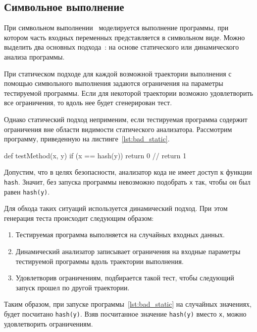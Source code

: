 \subsection{Символьное выполнение}
При символьном выполнении~\cite{symbolic_sbst} моделируется выполнение программы, при котором часть входных переменных представляется в символьном виде. Можно 
выделить два основных подхода~\cite{symbolic_execution}: на основе статического или динамического анализа программы.

При статическом подходе для каждой возможной траектории выполнения с помощью символьного выполнения задаются ограничения на параметры тестируемой программы. 
Если для некоторой траектории возможно удовлетворить все ограничения, то вдоль нее будет сгенерирован тест.

Однако статический подход неприменим, если тестируемая программа содержит ограничения вне области видимости статического анализатора. Рассмотрим программу, 
приведенную на листинге~\ref{lst:bad_static}.

\begin{snippet}[caption={Пример, на котором не применим статический подход}, label={lst:bad_static}]
  def testMethod(x, y) {
      if (x == hash(y)) {
          return 0	// %
      }
      return 1
  }
\end{snippet}

Допустим, что в целях безопасности, анализатор кода не имеет доступ к функции \texttt{hash}. Значит, без запуска программы невозможно подобрать \texttt{x} так, 
чтобы он был равен \texttt{hash(y)}.

Для обхода таких ситуаций используется динамический подход. При этом генерация теста происходит следующим образом:
\begin{enumerate}
 \item Тестируемая программа выполняется на случайных входных данных.
 \item Динамический анализатор записывает ограничения на входные параметры тестируемой программы вдоль траектории выполнения.
 \item Удовлетворив ограничениям, подбирается такой тест, чтобы следующий запуск прошел по другой траектории.
\end{enumerate}

Таким образом, при запуске программы~\ref{lst:bad_static} на случайных значениях, будет посчитано \texttt{hash(y)}. Взяв посчитанное значение \texttt{hash(y)} 
вместо \texttt{x}, можно удовлетворить ограничениям.

